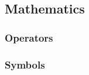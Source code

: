 \documentclass{article}
\begin{document}
\subsection{Mathematics}
    \subsubsection{Operators}
    
    \label{secc:Math-Operators}

    \subsubsection{Symbols}
    
    \label{secc:Math-Symbols}

\newpage

\end{document}
